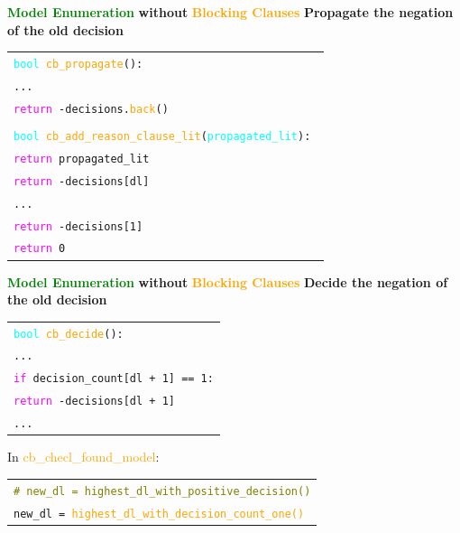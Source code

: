 \documentclass{beamer}
\begin{document}
\begin{frame}{\textcolor{green}{\textbf{Model Enumeration}} \textbf{without} \textcolor{orange}{\textbf{Blocking Clauses}}}
  \textbf{Propagate the negation of the old decision}
  \begin{beamerbox}[Beispielbox]
    \begin{tabular}{l}
    \texttt{\textcolor{cyan}{bool} \textcolor{orange}{cb\_propagate}(): } \\
    \texttt{\quad ...} \\
    \texttt{\quad \textcolor{magenta}{return} -decisions.\textcolor{orange}{back}()} \\
    \\
    \texttt{\textcolor{cyan}{bool} \textcolor{orange}{cb\_add\_reason\_clause\_lit}(\textcolor{cyan}{propagated\_lit}): } \\
    \texttt{\quad \textcolor{magenta}{return} propagated\_lit} \\
    \texttt{\quad \textcolor{magenta}{return} -decisions[dl]} \\
    \texttt{\quad ...}\\
    \texttt{\quad \textcolor{magenta}{return} -decisions[1]} \\
    \texttt{\quad \textcolor{magenta}{return} 0}
    \end{tabular}
  \end{beamerbox}
\end{frame}

\begin{frame}{\textcolor{green}{\textbf{Model Enumeration}} \textbf{without} \textcolor{orange}{\textbf{Blocking Clauses}}}
  \textbf{Decide the negation of the old decision}
  \begin{beamerbox}[Beispielbox]
    \begin{tabular}{l}
    \texttt{\textcolor{cyan}{bool} \textcolor{orange}{cb\_decide}(): } \\
    \texttt{\quad ...} \\
    \texttt{\quad \textcolor{magenta}{if} decision\_count[dl + 1] == 1:} \\
    \texttt{\quad \quad \textcolor{magenta}{return} -decisions[dl + 1]} \\
    \texttt{\quad ...}
    \end{tabular}
  \end{beamerbox}
  In \textcolor{orange}{cb\_checl\_found\_model}:
  \begin{beamerbox}[Beispielbox]
    \begin{tabular}{l}
    \texttt{\textcolor{olive}{\# new\_dl = highest\_dl\_with\_positive\_decision()}} \\
    \texttt{new\_dl = \textcolor{orange}{highest\_dl\_with\_decision\_count\_one()}}
    \end{tabular}
  \end{beamerbox}
\end{frame}
\end{document}
